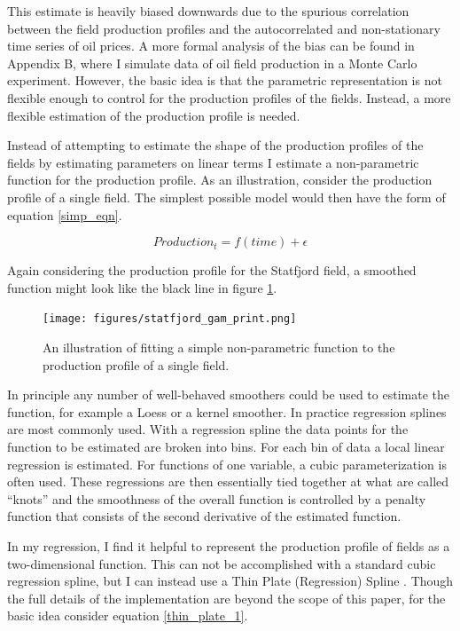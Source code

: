 \documentclass[11pt]{article}
\begin{document}
This estimate is heavily biased downwards due to the spurious correlation between the field production profiles and the autocorrelated and non-stationary time series of oil prices.  A more formal analysis of the bias can be found in Appendix B, where I simulate data of oil field production in a Monte Carlo experiment.  However, the basic idea is that the parametric representation is not flexible enough to control for the production profiles of the fields.   Instead, a more flexible estimation of the production profile is needed. 

Instead of attempting to estimate the shape of the production profiles of the fields by estimating parameters on linear terms I estimate a non-parametric function for the production profile.  As an illustration, consider the production profile of a single field.  The simplest possible model would then have the form of equation \ref{simp_eqn}. 

\begin{equation}
Production_{t}=f(time) + \epsilon
	\label{simp_eqn}
\end{equation}

Again considering the production profile for the Statfjord field, a smoothed function might look like the black line in figure \ref{statfjord_gam}.   

\begin{figure}
	\texttt{[image: figures/statfjord\_gam\_print.png]}
	\caption{An illustration of fitting a simple non-parametric function to the production profile of a single field.}
	\label{statfjord_gam}
\end{figure}

In principle any number of well-behaved smoothers could be used to estimate the function, for example a Loess or a kernel smoother.  In practice regression splines are most commonly used.  With a regression spline the data points for the function to be estimated are broken into bins.  For each bin of data a local linear regression is estimated.  For functions of one variable, a cubic parameterization is often used.  These regressions are then essentially tied together at what are called “knots” and the smoothness of the overall function is controlled by a penalty function that consists of the second derivative of the estimated function.

In my regression, I find it helpful to represent the production profile of fields as a two-dimensional function.  This can not be accomplished with a standard cubic regression spline, but I can instead use a Thin Plate (Regression) Spline \citep{wood_thin_2003}.  Though the full details of the implementation are beyond the scope of this paper, for the basic idea consider equation \ref{thin_plate_1}.  
\end{document}
